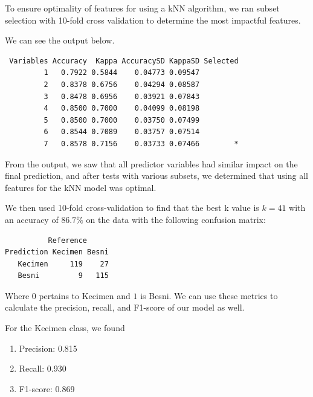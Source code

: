 \documentclass{article}
\begin{document}
\vspace{5mm}

\noindent To ensure optimality of features for using a kNN algorithm, we ran subset selection with 10-fold cross validation to determine the most impactful features.

\vspace{5mm}

\noindent We can see the output below.


\begin{verbatim}
 Variables Accuracy  Kappa AccuracySD KappaSD Selected
         1   0.7922 0.5844    0.04773 0.09547         
         2   0.8378 0.6756    0.04294 0.08587         
         3   0.8478 0.6956    0.03921 0.07843         
         4   0.8500 0.7000    0.04099 0.08198         
         5   0.8500 0.7000    0.03750 0.07499         
         6   0.8544 0.7089    0.03757 0.07514         
         7   0.8578 0.7156    0.03733 0.07466        *

\end{verbatim}

\noindent From the output, we saw that all predictor variables had similar impact on the final prediction, and after tests with various subsets, we determined that using all features for the kNN model was optimal.

\vspace{5mm}

\noindent We then used 10-fold cross-validation to find that the best k value is $k = 41$ with an accuracy of $86.7\%$ on the data with the following confusion matrix:

\begin{verbatim}
          Reference
Prediction Kecimen Besni
   Kecimen     119    27
   Besni         9   115
\end{verbatim}

\noindent Where $0$ pertains to Kecimen and $1$ is Besni. We can use these metrics to calculate the precision, recall, and F1-score of our model as well.

\vspace{5mm}

\noindent For the Kecimen class, we found

\begin{enumerate}
    \item Precision: 0.815

    \item Recall: 0.930

    \item F1-score: 0.869
\end{enumerate}
\end{document}
